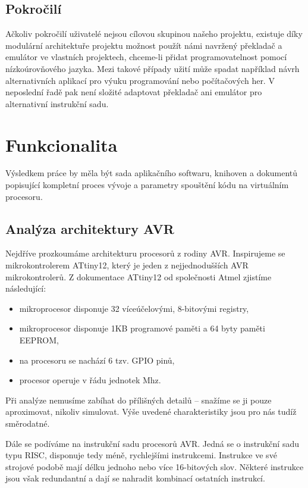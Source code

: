 \subsection{Pokročilí}

Ačkoliv pokročilí uživatelé nejsou cílovou skupinou našeho projektu, existuje díky modulární architektuře projektu možnost použít námi navržený překladač a emulátor ve vlastních projektech, chceme-li přidat programovatelnost pomocí nízkoúrovňového jazyka. Mezi takové případy užití může spadat například návrh alternativních aplikací pro výuku programování nebo počítačových her. V neposlední řadě pak není složité adaptovat překladač ani emulátor pro alternativní instrukční sadu.

\section{Funkcionalita}

Výsledkem práce by měla být sada aplikačního softwaru, knihoven a dokumentů popisující kompletní proces vývoje a parametry spouštění kódu na virtuálním procesoru.

\subsection{Analýza architektury AVR}
\label{sec:spec-avr}

Nejdříve prozkoumáme architekturu procesorů z rodiny AVR. Inspirujeme se mikrokontrolerem ATtiny12, který je jeden z nejjednodušších AVR mikrokontrolerů. Z dokumentace ATtiny12 od společnosti Atmel\cite{attiny12-datasheet} zjistíme následující:

\begin{itemize}
	\item mikroprocesor disponuje 32 víceúčelovými, 8-bitovými registry,
	\item mikroprocesor disponuje 1KB programové paměti a 64 byty paměti EEPROM,
	\item na procesoru se nachází 6 tzv. GPIO pinů,
	\item procesor operuje v řádu jednotek Mhz.
\end{itemize}

Při analýze nemusíme zabíhat do přílišných detailů -- snažíme se ji pouze aproximovat, nikoliv simulovat. Výše uvedené charakteristiky jsou pro nás tudíž směrodatné.

Dále se podíváme na instrukční sadu procesorů AVR. Jedná se o instrukční sadu typu RISC, disponuje tedy méně, rychlejšími instrukcemi. Instrukce ve své strojové podobě mají délku jednoho nebo více 16-bitových slov. Některé instrukce jsou však redundantní a dají se nahradit kombinací ostatních instrukcí.


